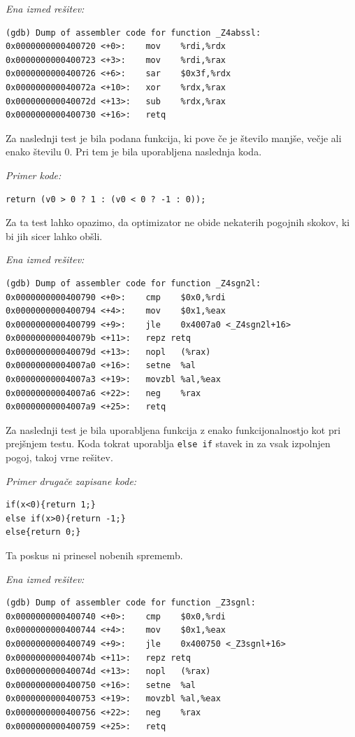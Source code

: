\documentclass[a4paper, 12pt]{book}
\begin{document}
\medskip

\noindent
{\it Ena izmed rešitev:}
\begin{Verbatim}[baselinestretch=1]
(gdb) Dump of assembler code for function _Z4abssl:
0x0000000000400720 <+0>: 	mov    %rdi,%rdx
0x0000000000400723 <+3>: 	mov    %rdi,%rax
0x0000000000400726 <+6>: 	sar    $0x3f,%rdx
0x000000000040072a <+10>:	xor    %rdx,%rax
0x000000000040072d <+13>:	sub    %rdx,%rax
0x0000000000400730 <+16>:	retq   
\end{Verbatim}

Za naslednji test je bila podana funkcija, ki pove če je število manjše, večje ali enako številu 0. Pri tem je bila uporabljena naslednja koda.
\medskip

\noindent
{\it Primer kode:}
\begin{Verbatim}[baselinestretch=1]
return (v0 > 0 ? 1 : (v0 < 0 ? -1 : 0));
\end{Verbatim}

Za ta test lahko opazimo, da optimizator ne obide nekaterih pogojnih skokov, ki bi jih sicer lahko obšli.
\medskip

\noindent
{\it Ena izmed rešitev:}
\begin{Verbatim}[baselinestretch=1]
(gdb) Dump of assembler code for function _Z4sgn2l:
0x0000000000400790 <+0>: 	cmp    $0x0,%rdi
0x0000000000400794 <+4>: 	mov    $0x1,%eax
0x0000000000400799 <+9>: 	jle    0x4007a0 <_Z4sgn2l+16>
0x000000000040079b <+11>:	repz retq 
0x000000000040079d <+13>:	nopl   (%rax)
0x00000000004007a0 <+16>:	setne  %al
0x00000000004007a3 <+19>:	movzbl %al,%eax
0x00000000004007a6 <+22>:	neg    %rax
0x00000000004007a9 <+25>:	retq 
\end{Verbatim}

Za naslednji test je bila uporabljena funkcija z enako funkcijonalnostjo kot pri prejšnjem testu. Koda tokrat uporablja \texttt{else if} stavek in za vsak izpolnjen pogoj, takoj vrne rešitev.
\medskip

\noindent
{\it Primer drugače zapisane kode:}
\begin{Verbatim}[baselinestretch=1]
if(x<0){return 1;}
else if(x>0){return -1;}
else{return 0;}
\end{Verbatim}
Ta poskus ni prinesel nobenih sprememb.
\medskip

\noindent
{\it Ena izmed rešitev:}
\begin{Verbatim}[baselinestretch=1]
(gdb) Dump of assembler code for function _Z3sgnl:
0x0000000000400740 <+0>: 	cmp    $0x0,%rdi
0x0000000000400744 <+4>: 	mov    $0x1,%eax
0x0000000000400749 <+9>: 	jle    0x400750 <_Z3sgnl+16>
0x000000000040074b <+11>:	repz retq 
0x000000000040074d <+13>:	nopl   (%rax)
0x0000000000400750 <+16>:	setne  %al
0x0000000000400753 <+19>:	movzbl %al,%eax
0x0000000000400756 <+22>:	neg    %rax
0x0000000000400759 <+25>:	retq  
\end{Verbatim}
\end{document}
